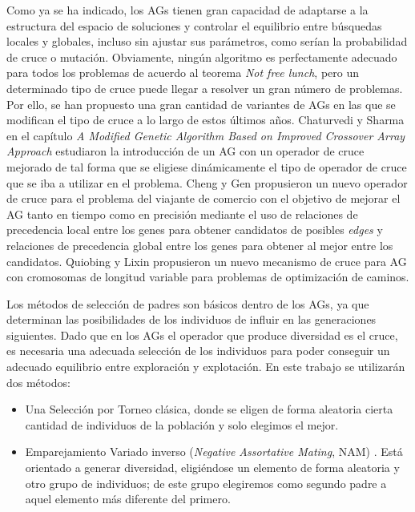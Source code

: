 Como ya se ha indicado, los AGs tienen gran capacidad de adaptarse a la estructura del espacio de soluciones y controlar el equilibrio entre búsquedas locales y globales, incluso sin ajustar sus parámetros, como serían la probabilidad de cruce o mutación. 
Obviamente, ningún algoritmo es perfectamente adecuado para todos los problemas de acuerdo al teorema \textit{Not free lunch}, pero un determinado tipo de cruce puede llegar a resolver un gran número de problemas. 
Por ello, se han propuesto una gran cantidad de variantes de AGs en las que se modifican el tipo de cruce a lo largo de estos últimos años. 
Chaturvedi y Sharma en el capítulo \textit{A Modified Genetic Algorithm Based on Improved Crossover Array Approach} \parencite{chaturvediModifiedGeneticAlgorithm2019} estudiaron la introducción de un AG con un operador de cruce mejorado de tal forma que se eligiese dinámicamente el tipo de operador de cruce que se iba a utilizar en el problema. 
Cheng y Gen \parencite{chengCrossoverIntensiveSearch1994} propusieron un nuevo operador de cruce para el problema del viajante de comercio con el objetivo de mejorar el AG tanto en tiempo como en precisión mediante el uso de relaciones de precedencia local entre los genes para obtener candidatos de posibles \textit{edges} y relaciones de precedencia global entre los genes para obtener al mejor entre los candidatos. 
Quiobing y Lixin \parencite{qiongbingNewCrossoverMechanism2016} propusieron un nuevo mecanismo de cruce para AG con cromosomas de longitud variable para problemas de optimización de caminos. 


Los métodos de selección de padres son básicos dentro de los AGs, ya que determinan las posibilidades de los individuos de influir en las generaciones siguientes. 
Dado que en los AGs el operador que produce diversidad es el cruce, es necesaria una adecuada selección de los individuos para poder conseguir un adecuado equilibrio entre exploración y explotación. 
En este trabajo se utilizarán dos métodos:
\begin{itemize}
	\item Una Selección por Torneo clásica, donde se eligen de forma aleatoria cierta cantidad de individuos de la población y solo elegimos el mejor. 
	\item Emparejamiento Variado inverso (\textit{Negative Assortative Mating}, NAM) \parencite{fernandesStudyNonrandomMating2001}. 
	Está orientado a generar diversidad, eligiéndose un elemento de forma aleatoria y otro grupo de individuos; de este grupo elegiremos como segundo padre a aquel elemento más diferente del primero. 
\end{itemize}

